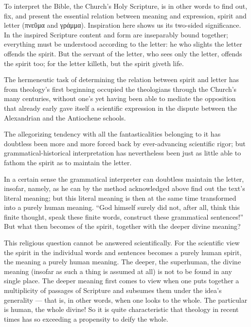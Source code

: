 \documentclass[12pt,a4paper]{book}
\begin{document}
To interpret the Bible, the Church's Holy Scripture, is in other words to find out,
fix, and present the essential relation between meaning and expression, spirit and
letter (πνεῦμα and γράμμα). Inspiration here shows us its two-sided significance. In
the inspired Scripture content and form are inseparably bound together; everything
must be understood according to the letter: he who slights the letter offends the
spirit. But the servant of the letter, who sees only the letter, offends the spirit
too; for the letter killeth, but the spirit giveth life.

The hermeneutic task of determining the relation between spirit and letter has from
theology's first beginning occupied the theologians through the Church's many
centuries, without one's yet having been able to mediate the opposition
that already early gave itself a scientific expression in the dispute between the
Alexandrian and the Antiochene schools.

The allegorizing tendency with all the fantasticalities belonging to it has doubtless
been more and more forced back by ever-advancing scientific rigor; but
grammatical-historical interpretation has nevertheless been just as little able to
fathom the spirit as to maintain the letter.

In a certain sense the grammatical interpreter can doubtless maintain the letter,
insofar, namely, as he can by the method acknowledged above find out the text's
literal meaning; but this literal meaning is then at the same time transformed into a
purely human meaning. ``God himself surely did not, after all, think this finite
thought, speak these finite words, construct these grammatical sentences!'' But what
then becomes of the spirit, together with the deeper divine meaning?

This religious question cannot be answered scientifically. For the scientific view
the spirit in the individual words and sentences becomes a purely human spirit, the
meaning a purely human meaning. The deeper, the superhuman, the divine meaning
(insofar as such a thing is assumed at all) is not to be found in any single place.
The deeper meaning first comes to view when one puts together a multiplicity of
passages of Scripture and subsumes them under the idea's generality --- that is, in
other words, when one looks to the whole. The particular is human, the whole divine!
So it is quite characteristic that theology in recent times has so exceeding a
propensity to deify the whole.
\end{document}
